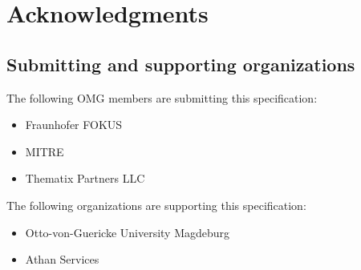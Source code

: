 \documentclass[10pt,fleqn,final]{scrreprt}
\newenvironment{definitions}[0]{\medskip }{}
\begin{document}
\begin{definitions}

\section{Acknowledgments}
\subsection{Submitting and supporting organizations}
The following  OMG  members are submitting this specification:
	\begin{itemize}
		\item Fraunhofer FOKUS
		\item MITRE		
		\item Thematix Partners LLC
	\end{itemize}
The following organizations are supporting this specification: 
	\begin{itemize}
		\item Otto-von-Guericke University Magdeburg 
		\item Athan Services 
	\end{itemize}





\end{definitions}
\end{document}
